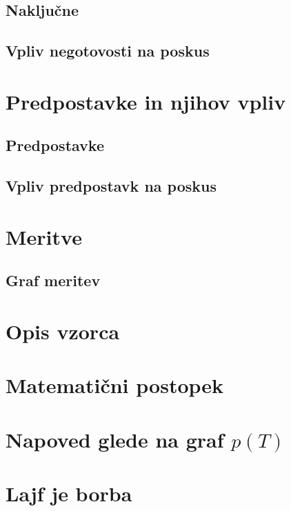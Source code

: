 \documentclass{article}
\begin{document}
\subsection*{Naključne}
\subsection*{Vpliv negotovosti na poskus}

\section*{Predpostavke in njihov vpliv}
\subsection*{Predpostavke}
\subsection*{Vpliv predpostavk na poskus}

\section*{Meritve}
\subsection*{Graf meritev}

\section*{Opis vzorca}

\section*{Matematični postopek}

\section*{Napoved glede na graf $p(T)$}

\section*{Lajf je borba}
\end{document}
